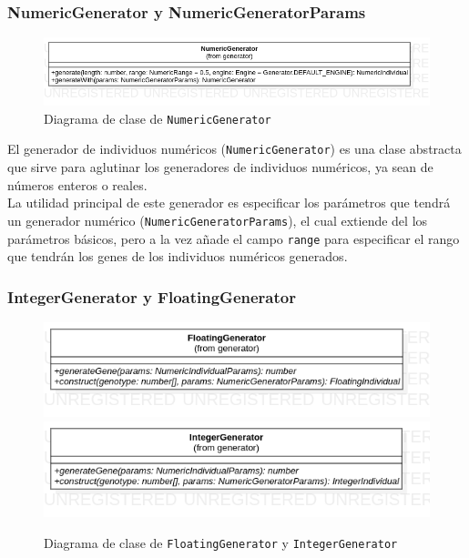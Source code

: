 \subsubsection{NumericGenerator y NumericGeneratorParams}

\begin{figure}[ht]
    \centering
    \includegraphics[scale=0.5]{mem/images/cap-4/4.2.3(Generador)/NumericGenerator.png}
    \caption{Diagrama de clase de \texttt{NumericGenerator}}
    \label{fig:generator-uml}
\end{figure}

El generador de individuos numéricos (\texttt{NumericGenerator}) es una clase abstracta que sirve para aglutinar los generadores de individuos numéricos, ya sean de números enteros o reales. \\

La utilidad principal de este generador es especificar los parámetros que tendrá un generador numérico (\texttt{NumericGeneratorParams}), el cual extiende del los parámetros básicos, pero a la vez añade el campo \texttt{range} para especificar el rango que tendrán los genes de los individuos numéricos generados.

\subsubsection{IntegerGenerator y FloatingGenerator}

\begin{figure}[ht]
    \centering
    \includegraphics[scale=0.42]{mem/images/cap-4/4.2.3(Generador)/FloatingGenerator.png}
    \includegraphics[scale=0.42]{mem/images/cap-4/4.2.3(Generador)/IntegerGenerator.png}
    \caption{Diagrama de clase de \texttt{FloatingGenerator} y \texttt{IntegerGenerator}}
    \label{fig:generator-uml}
\end{figure}

